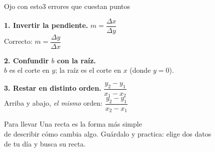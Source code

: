 \documentclass[12pt]{article}
\begin{document}
\begin{mwmodlamina}[mwrojonaranja]{Ojo con esto}{3 errores que cuestan puntos}
\begin{mwcajaalerta}
  {\textbf{1. Invertir la pendiente.}\quad
  $m=\dfrac{\Delta x}{\Delta y}$ \;\mwcmal\\[2pt]
  {\mwsmall Correcto: } $m=\dfrac{\Delta y}{\Delta x}$
  \;\mwcbien}
\end{mwcajaalerta}

\begin{mwcajaalerta}
  {\textbf{2. Confundir $b$ con la raíz.}\quad
  \mwcmal\\[2pt]
  {\mwsmall $b$ es el corte en $y$; la raíz es el corte en $x$
  (donde $y=0$).}}
\end{mwcajaalerta}

\begin{mwcajaalerta}
  {\textbf{3. Restar en distinto orden.}\quad
  $\dfrac{y_2-y_1}{x_1-x_2}$ \;\mwcmal\\[2pt]
  {\mwsmall Arriba y abajo, \emph{el mismo} orden: }
  $\dfrac{y_2-y_1}{x_2-x_1}$ \;\mwcbien}
\end{mwcajaalerta}
\end{mwmodlamina}

\mwmodfin
  {Para llevar}
  {Una recta es la forma más simple\\
   de describir cómo cambia algo.}
  {Guárdalo y practica: elige dos datos\\
   de tu día y busca su recta.}
\end{document}
